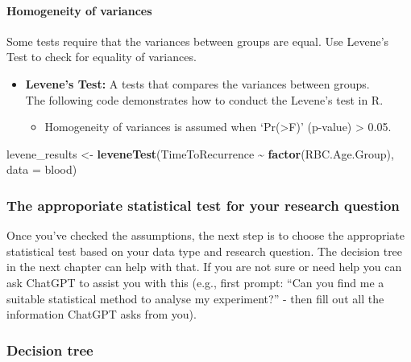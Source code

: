 \documentclass[
]{article}
\newenvironment{Shaded}{\begin{snugshade}}{\end{snugshade}}
\newcommand{\AttributeTok}[1]{\textcolor[rgb]{0.13,0.29,0.53}{#1}}
\newcommand{\FunctionTok}[1]{\textcolor[rgb]{0.13,0.29,0.53}{\textbf{#1}}}
\newcommand{\NormalTok}[1]{#1}
\newcommand{\OtherTok}[1]{\textcolor[rgb]{0.56,0.35,0.01}{#1}}
\newcommand{\SpecialCharTok}[1]{\textcolor[rgb]{0.81,0.36,0.00}{\textbf{#1}}}
\providecommand{\tightlist}{%
  \setlength{\itemsep}{0pt}\setlength{\parskip}{0pt}}
\begin{document}
\paragraph{Homogeneity of variances}\label{homogeneity-of-variances}

Some tests require that the variances between groups are equal. Use
Levene's Test to check for equality of variances.

\begin{itemize}
\item
  \textbf{Levene's Test:} A tests that compares the variances between
  groups.\\
  The following code demonstrates how to conduct the Levene's test in R.

  \begin{itemize}
  \tightlist
  \item
    Homogeneity of variances is assumed when `Pr(\textgreater F)'
    (p-value) \textgreater{} 0.05.
  \end{itemize}
\end{itemize}

\begin{Shaded}
\begin{Highlighting}[]
\NormalTok{levene\_results }\OtherTok{\textless{}{-}} \FunctionTok{leveneTest}\NormalTok{(TimeToRecurrence }\SpecialCharTok{\textasciitilde{}} \FunctionTok{factor}\NormalTok{(RBC.Age.Group), }\AttributeTok{data =}\NormalTok{ blood)}
\end{Highlighting}
\end{Shaded}

\subsubsection{The approporiate statistical test for your research
question}\label{the-approporiate-statistical-test-for-your-research-question}

Once you've checked the assumptions, the next step is to choose the
appropriate statistical test based on your data type and research
question. The decision tree in the next chapter can help with that. If
you are not sure or need help you can ask ChatGPT to assist you with
this (e.g., first prompt: ``Can you find me a suitable statistical
method to analyse my experiment?'' - then fill out all the information
ChatGPT asks from you).

\subsubsection{Decision tree}\label{decision-tree}
\end{document}
